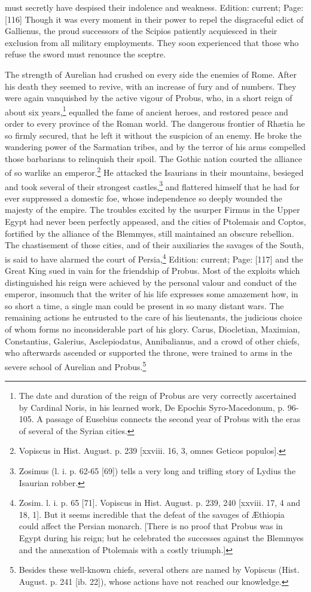 must secretly have despised their indolence and weakness. Edition: current; Page: [116] Though it was every moment in their power to repel the disgraceful edict of Gallienus, the proud successors of the Scipios patiently acquiesced in their exclusion from all military employments. They soon experienced that those who refuse the sword must renounce the sceptre.

The strength of Aurelian had crushed on every side the enemies of Rome. After his death they seemed to revive, with an increase of fury and of numbers. They were again vanquished by the active vigour of Probus, who, in a short reign of about six years,\footnote{The date and duration of the reign of Probus are very correctly ascertained by Cardinal Noris, in his learned work, De Epochis Syro-Macedonum, p. 96-105. A passage of Eusebius connects the second year of Probus with the eras of several of the Syrian cities.} equalled the fame of ancient heroes, and restored peace and order to every province of the Roman world. The dangerous frontier of Rhætia he so firmly secured, that he left it without the suspicion of an enemy. He broke the wandering power of the Sarmatian tribes, and by the terror of his arms compelled those barbarians to relinquish their spoil. The Gothic nation courted the alliance of so warlike an emperor.\footnote{Vopiscus in Hist. August. p. 239 [xxviii. 16, 3, omnes Geticos populos].} He attacked the Isaurians in their mountains, besieged and took several of their strongest castles,\footnote{Zosimus (l. i. p. 62-65 [69]) tells a very long and trifling story of Lydius the Isaurian robber.} and flattered himself that he had for ever suppressed a domestic foe, whose independence so deeply wounded the majesty of the empire. The troubles excited by the usurper Firmus in the Upper Egypt had never been perfectly appeased, and the cities of Ptolemais and Coptos, fortified by the alliance of the Blemmyes, still maintained an obscure rebellion. The chastisement of those cities, and of their auxiliaries the savages of the South, is said to have alarmed the court of Persia,\footnote{Zosim. l. i. p. 65 [71]. Vopiscus in Hist. August. p. 239, 240 [xxviii. 17, 4 and 18, 1]. But it seems incredible that the defeat of the savages of Æthiopia could affect the Persian monarch. [There is no proof that Probus was in Egypt during his reign; but he celebrated the successes against the Blemmyes and the annexation of Ptolemais with a costly triumph.]} Edition: current; Page: [117] and the Great King sued in vain for the friendship of Probus. Most of the exploits which distinguished his reign were achieved by the personal valour and conduct of the emperor, insomuch that the writer of his life expresses some amazement how, in so short a time, a single man could be present in so many distant wars. The remaining actions he entrusted to the care of his lieutenants, the judicious choice of whom forms no inconsiderable part of his glory. Carus, Diocletian, Maximian, Constantius, Galerius, Asclepiodatus, Annibalianus, and a crowd of other chiefs, who afterwards ascended or supported the throne, were trained to arms in the severe school of Aurelian and Probus.\footnote{Besides these well-known chiefs, several others are named by Vopiscus (Hist. August. p. 241 [ib. 22]), whose actions have not reached our knowledge.}

